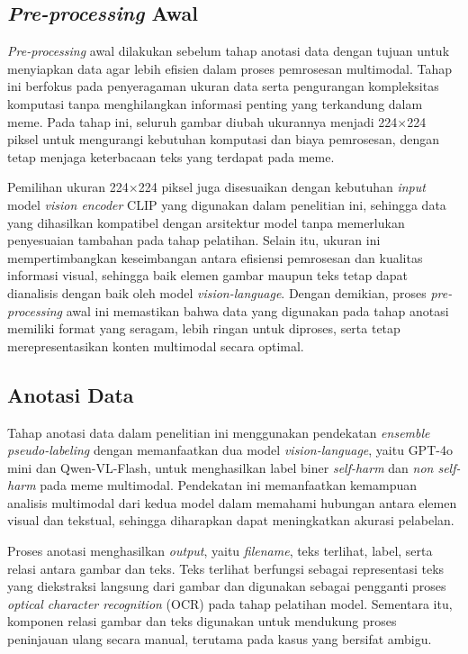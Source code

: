 \subsection{\textit{Pre-processing} Awal} \label{subsec:preprocessing_awal}
\textit{Pre-processing} awal dilakukan sebelum tahap anotasi data dengan tujuan untuk menyiapkan data agar lebih efisien dalam proses pemrosesan multimodal. Tahap ini berfokus pada penyeragaman ukuran data serta pengurangan kompleksitas komputasi tanpa menghilangkan informasi penting yang terkandung dalam meme. Pada tahap ini, seluruh gambar diubah ukurannya menjadi 224$\times$224 piksel untuk mengurangi kebutuhan komputasi dan biaya pemrosesan, dengan tetap menjaga keterbacaan teks yang terdapat pada meme.

Pemilihan ukuran 224$\times$224 piksel juga disesuaikan dengan kebutuhan \textit{input} model \textit{vision encoder} CLIP yang digunakan dalam penelitian ini, sehingga data yang dihasilkan kompatibel dengan arsitektur model tanpa memerlukan penyesuaian tambahan pada tahap pelatihan. Selain itu, ukuran ini mempertimbangkan keseimbangan antara efisiensi pemrosesan dan kualitas informasi visual, sehingga baik elemen gambar maupun teks tetap dapat dianalisis dengan baik oleh model \textit{vision-language}. Dengan demikian, proses \textit{pre-processing} awal ini memastikan bahwa data yang digunakan pada tahap anotasi memiliki format yang seragam, lebih ringan untuk diproses, serta tetap merepresentasikan konten multimodal secara optimal.

\subsection{Anotasi Data} \label{subsec:anotasi_data}
Tahap anotasi data dalam penelitian ini menggunakan pendekatan \textit{ensemble pseudo-labeling} dengan memanfaatkan dua model \textit{vision-language}, yaitu GPT-4o mini dan Qwen-VL-Flash, untuk menghasilkan label biner \textit{self-harm} dan \textit{non self-harm} pada meme multimodal. Pendekatan ini memanfaatkan kemampuan analisis multimodal dari kedua model dalam memahami hubungan antara elemen visual dan tekstual, sehingga diharapkan dapat meningkatkan akurasi pelabelan.

Proses anotasi menghasilkan \textit{output}, yaitu \textit{filename}, teks terlihat, label, serta relasi antara gambar dan teks. Teks terlihat berfungsi sebagai representasi teks yang diekstraksi langsung dari gambar dan digunakan sebagai pengganti proses \textit{optical character recognition} (OCR) pada tahap pelatihan model. Sementara itu, komponen relasi gambar dan teks digunakan untuk mendukung proses peninjauan ulang secara manual, terutama pada kasus yang bersifat ambigu.

